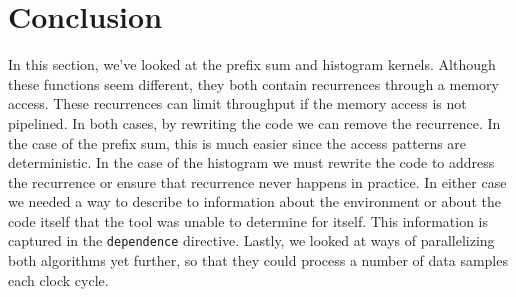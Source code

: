 \section{Conclusion}
In this section, we've looked at the prefix sum and histogram kernels.  Although these functions seem different, they both contain recurrences through a memory access.  These recurrences can limit throughput if the memory access is not pipelined.  In both cases, by rewriting the code we can remove the recurrence.  In the case of the prefix sum, this is much easier since the access patterns are deterministic.  In the case of the histogram we must rewrite the code to address the recurrence or ensure that recurrence never happens in practice.   In either case we needed a way to describe to \VHLS information about the environment or about the code itself that the tool was unable to determine for itself.  This information is captured in the \lstinline{dependence} directive.  Lastly, we looked at ways of parallelizing both algorithms yet further, so that they could process a number of data samples each clock cycle.
